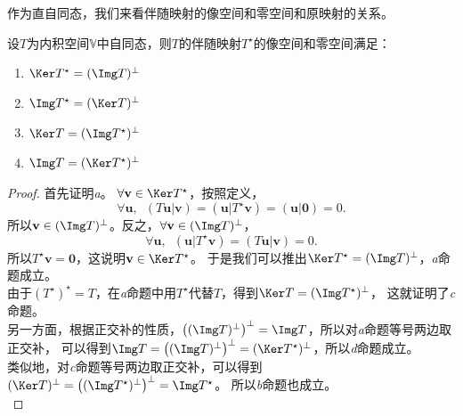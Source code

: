 \documentclass[12pt,UTF8]{ctexbook}
\begin{document}
作为直自同态，我们来看伴随映射的像空间和零空间和原映射的关系。
\begin{pp}\label{pp:8_4}
    设$T$为内积空间$\mathbb{V}$中自同态，则$T$的伴随映射$T^\star$的像空间和零空间满足：
    \begin{enumerate}[label=\alph*.]   
        \item $\Ker T^\star = (\Img T)^\perp$
        \item $\Img T^\star = (\Ker T)^\perp$
        \item $\Ker T = (\Img T^\star)^\perp$
        \item $\Img T = (\Ker T^\star)^\perp$
    \end{enumerate}
\end{pp}
\begin{proof} %
    首先证明\textit{a}。
    $\forall \mathbf{v} \in \Ker T^\star$，按照定义，
    $$ \forall \mathbf{u}, \,\,\,(T\mathbf{u} | \mathbf{v}) = (\mathbf{u} | T^\star\mathbf{v}) = (\mathbf{u} | \mathbf{0}) = 0.  $$
    所以$\mathbf{v} \in (\Img T)^\perp$。反之，$\forall \mathbf{v} \in (\Img T)^\perp$，
    $$ \forall \mathbf{u}, \,\,\, (\mathbf{u} | T^\star\mathbf{v}) = (T\mathbf{u} | \mathbf{v}) = 0.$$
    所以$T^\star\mathbf{v} = \mathbf{0}$，这说明$\mathbf{v} \in \Ker T^\star$。
    于是我们可以推出$\Ker T^\star = (\Img T)^\perp$，\textit{a}命题成立。\\
    由于$ (T^\star)^\star = T $，在\textit{a}命题中用$T^\star$代替$T$，得到$\Ker T = (\Img T^\star)^\perp$，
    这就证明了\textit{c}命题。\\
    另一方面，根据正交补的性质，$\left((\Img T)^\perp\right)^\perp = \Img T$，所以对\textit{a}命题等号两边取正交补，
    可以得到$\Img T = \left((\Img T)^\perp\right)^\perp = (\Ker T^\star)^\perp$，所以\textit{d}命题成立。\\
    类似地，对\textit{c}命题等号两边取正交补，可以得到$(\Ker T)^\perp = \left((\Img T^\star)^\perp\right)^\perp = \Img T^\star$。
    所以\textit{b}命题也成立。\\
\end{proof}
\end{document}
